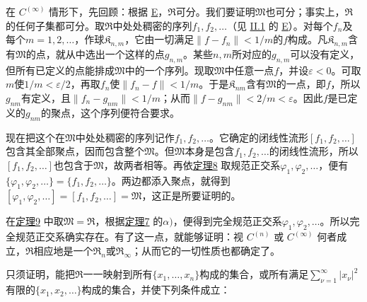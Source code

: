 \documentclass[fontsize=13pt,twoside,openany,headings=normal,parskip=false,bookmarkpackage=false,DIV=calc]{scrbook}
\begin{document}
在 \hyperref[ax:II.Cinfty]{$C^{(\infty)}$} 情形下，先回顾：根据 \hyperref[ax:II.E]{E}，$\mathfrak{R}$可分。我们要证明$\mathfrak{M}$也可分；事实上，$\mathfrak{R}$的任何子集都可分。取$\mathfrak{R}$中处处稠密的序列$f_1,\allowbreak f_2,\allowbreak \ldots$（见 \hyperref[sec:II.1]{II.1} 的 \hyperref[ax:II.E]{E}）。对每个$f_n$及每个$m=1,\allowbreak 2,\allowbreak \ldots$，作球$\mathfrak{K}_{n,\allowbreak m}$，它由一切满足$\|f-f_n\|<1/m$的$f$构成。凡$\mathfrak{K}_{n,\allowbreak m}$含有$\mathfrak{M}$的点，就从中选出一个这样的点$g_{n,\allowbreak m}$。某些$n,\allowbreak m$所对应的$g_{n,\allowbreak m}$可以没有定义，但所有已定义的点能排成$\mathfrak{M}$中的一个序列。现取$\mathfrak{M}$中任意一点$f$，并设$\varepsilon<0$。可取$m$使$1/m<\varepsilon/2$，再取$f_n$使$\|f_n-f\|<1/m$。于是$\mathfrak{K}_{nm}$含有$\mathfrak{M}$的一点，即$f$，所以$g_{nm}$有定义，且$\|f_n-g_{nm}\|<1/m$；从而$\|f-g_{nm}\|<2/m<\varepsilon$。因此$f$是已定义的$g_{nm}$的聚点，这个序列便符合要求。

现在把这个在$\mathfrak{M}$中处处稠密的序列记作$f_1,\allowbreak f_2,\allowbreak \ldots$。它确定的闭线性流形$[f_1,\allowbreak f_2,\allowbreak \ldots]$包含其全部聚点，因而包含整个$\mathfrak{M}$。但$\mathfrak{M}$本身是包含$f_1,\allowbreak f_2,\allowbreak \ldots$的闭线性流形，所以$[f_1,\allowbreak f_2,\allowbreak \ldots]$也包含于$\mathfrak{M}$，故两者相等。再依\CJKglue \hyperref[thm:II.8]{定理8} 取规范正交系$\varphi_1,\allowbreak \varphi_2,\allowbreak \ldots$，便有$\{\varphi_1,\allowbreak \varphi_2,\allowbreak \ldots\}=\{f_1,\allowbreak f_2,\allowbreak \ldots\}$。两边都添入聚点，就得到$[\varphi_1,\allowbreak \varphi_2,\allowbreak \ldots]=[f_1,\allowbreak f_2,\allowbreak \ldots]=\mathfrak{M}$，这正是所要证明的。

在\CJKglue \hyperref[thm:II.9]{定理9} 中取$\mathfrak{M}=\mathfrak{R}$，根据\CJKglue \hyperref[thm:II.7]{定理7} 的$\alpha)$，便得到完全规范正交系$\varphi_1,\allowbreak \varphi_2,\allowbreak \ldots$。所以完全规范正交系确实存在。有了这一点，就能够证明：视 \hyperref[ax:II.Cn]{$C^{(n)}$} 或 \hyperref[ax:II.Cinfty]{$C^{(\infty)}$} 何者成立，$\mathfrak{R}$相应地是一个$\mathfrak{R}_n$或$\mathfrak{R}_\infty$；从而它的一切性质也都确定了。

只须证明，能把$\mathfrak{R}$一一映射到所有$\{x_1,\allowbreak \ldots,\allowbreak x_n\}$构成的集合，或所有满足$\sum_{\nu=1}^\infty|x_\nu|^2$有限的$\{x_1,\allowbreak x_2,\allowbreak \ldots\}$构成的集合，并使下列条件成立：
\end{document}
